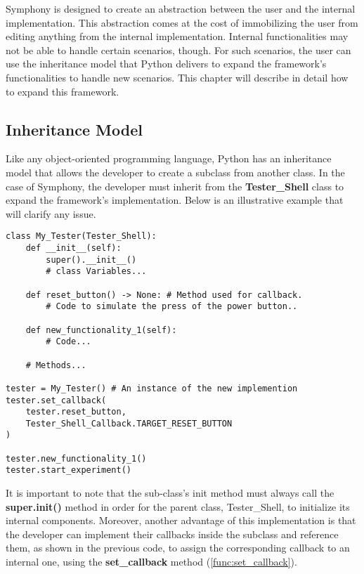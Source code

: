Symphony is designed to create an abstraction between the user and the internal implementation. This abstraction comes at the cost of immobilizing the user from editing anything from the internal implementation. Internal functionalities may not be able to handle certain scenarios, though. For such scenarios, the user can use the inheritance model that Python delivers to expand the framework's functionalities to handle new scenarios. This chapter will describe in detail how to expand this framework.

\subsection{Inheritance Model}
Like any object-oriented programming language, Python has an inheritance model that allows the developer to create a subclass from another class. In the case of Symphony, the developer must inherit from the \textbf{Tester\_Shell} class to expand the framework's implementation. Below is an illustrative example that will clarify any issue. 


\begin{lstlisting}
class My_Tester(Tester_Shell):
    def __init__(self):
        super().__init__()
        # class Variables...
    
    def reset_button() -> None: # Method used for callback.
        # Code to simulate the press of the power button..
        
    def new_functionality_1(self):
        # Code...

    # Methods... 

tester = My_Tester() # An instance of the new implemention
tester.set_callback(
    tester.reset_button,
    Tester_Shell_Callback.TARGET_RESET_BUTTON 
)

tester.new_functionality_1()
tester.start_experiment()

\end{lstlisting}

It is important to note that the sub-class's init method must always call the \textbf{super.init()} method in order for the parent class, Tester\_Shell, to initialize its internal components. Moreover, another advantage of this implementation is that the developer can implement their callbacks inside the subclass and reference them, as shown in the previous code, to assign the corresponding callback to an internal one, using the \textbf{set\_callback} method (\autoref{func:set_callback}).